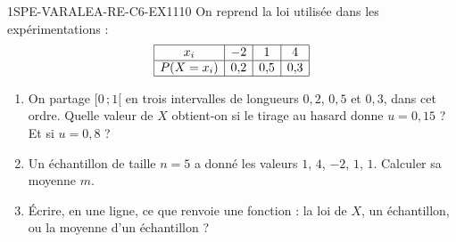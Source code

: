 
\begin{exercice}{1SPE-VARALEA-RE-C6-EX1}{1}{10}
On reprend la loi utilisée dans les expérimentations :
\[
\begin{array}{|c|c|c|c|}
\hline
x_i & -2 & 1 & 4 \\
\hline
P(X=x_i) & 0{,}2 & 0{,}5 & 0{,}3 \\
\hline
\end{array}
\]
\begin{enumerate}
  \item On partage $[0\,;1[$ en trois intervalles de longueurs $0{,}2$,
        $0{,}5$ et $0{,}3$, dans cet ordre. Quelle valeur de $X$ obtient-on
        si le tirage au hasard donne $u=0{,}15$ ? Et si $u=0{,}8$ ?
  \item Un échantillon de taille $n=5$ a donné les valeurs
        $1$, $4$, $-2$, $1$, $1$. Calculer sa moyenne $m$.
  \item Écrire, en une ligne, ce que renvoie une fonction
         : la loi de $X$, un échantillon,
        ou la moyenne d'un échantillon ?
\end{enumerate}
\end{exercice}

